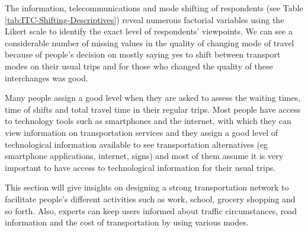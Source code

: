 \documentclass[
11pt, %
oneside, %
english, %
singlespacing, %
]{macthesis} %
\newcommand{\blandscape}{\begin{landscape}}
\newcommand{\elandscape}{\end{landscape}}
\begin{document}
\newpage
\blandscape
\begin{table}

\caption{\label{tab:unnamed-chunk-12}\label{tab:Social-Interaction-Descriptives}Variables regarding social interactions of respondents}
\centering
{}
\end{table}
\elandscape
\newpage

The information, telecommunications and mode shifting of respondents (see Table \ref{tab:ITC-Shifting-Descriptives}) reveal numerous factorial variables using the Likert scale to identify the exact level of respondents' viewpoints. We can see a considerable number of missing values in the quality of changing mode of travel because of people's decision on mostly saying yes to shift between transport modes on their usual trips and for those who changed the quality of these interchanges was good.

Many people assign a good level when they are asked to assess the waiting times, time of shifts and total travel time in their regular trips. Most people have access to technology tools such as smartphones and the internet, with which they can view information on transportation services and they assign a good level of technological information available to see transportation alternatives (eg smartphone applications, internet, signs) and most of them assume it is very important to have access to technological information for their usual trips.

This section will give insights on designing a strong transportation network to facilitate people's different activities such as work, school, grocery shopping and so forth. Also, experts can keep users informed about traffic circumstances, road information and the cost of transportation by using various modes.
\end{document}
